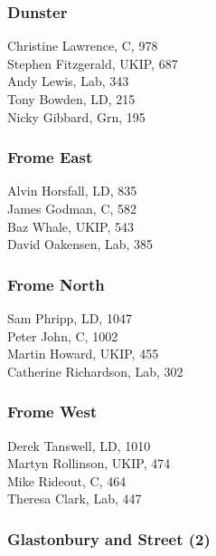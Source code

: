 \documentclass[a4paper,openany,10pt]{book}
\begin{document}
\subsubsection*{Dunster}



Christine Lawrence, C, 978\\
Stephen Fitzgerald, UKIP, 687\\
Andy Lewis, Lab, 343\\
Tony Bowden, LD, 215\\
Nicky Gibbard, Grn, 195\\


\subsubsection*{Frome East}



Alvin Horsfall, LD, 835\\
James Godman, C, 582\\
Baz Whale, UKIP, 543\\
David Oakensen, Lab, 385\\


\subsubsection*{Frome North}



Sam Phripp, LD, 1047\\
Peter John, C, 1002\\
Martin Howard, UKIP, 455\\
Catherine Richardson, Lab, 302\\


\subsubsection*{Frome West}



Derek Tanswell, LD, 1010\\
Martyn Rollinson, UKIP, 474\\
Mike Rideout, C, 464\\
Theresa Clark, Lab, 447\\


\subsubsection*{Glastonbury and Street (2)}
\end{document}
